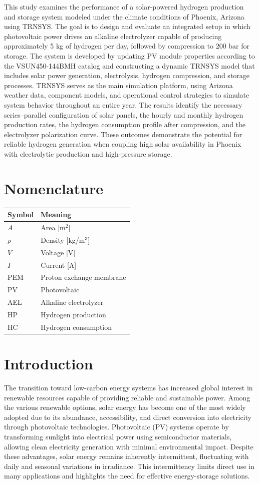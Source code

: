 \documentclass[11pt,a4paper]{article}
\begin{document}
This study examines the performance of a solar-powered hydrogen production and storage system modeled under the climate conditions of Phoenix, Arizona using TRNSYS. The goal is to design and evaluate an integrated setup in which photovoltaic power drives an alkaline electrolyzer capable of producing approximately 5 kg of hydrogen per day, followed by compression to 200 bar for storage. The system is developed by updating PV module properties according to the VSUN450-144BMH catalog and constructing a dynamic TRNSYS model that includes solar power generation, electrolysis, hydrogen compression, and storage processes. TRNSYS serves as the main simulation platform, using Arizona weather data, component models, and operational control strategies to simulate system behavior throughout an entire year. The results identify the necessary series--parallel configuration of solar panels, the hourly and monthly hydrogen production rates, the hydrogen consumption profile after compression, and the electrolyzer polarization curve. These outcomes demonstrate the potential for reliable hydrogen generation when coupling high solar availability in Phoenix with electrolytic production and high-pressure storage.

\section*{Nomenclature}
\begin{tabular}{ll}\toprule Symbol & Meaning\\\midrule
$A$ & Area [m$^2$]\\$\rho$ & Density [kg/m$^3$]\\$V$ & Voltage [V]\\$I$ & Current [A]\\PEM & Proton exchange membrane\\PV & Photovoltaic\\AEL & Alkaline electrolyzer\\HP & Hydrogen production\\HC & Hydrogen consumption\\\bottomrule\end{tabular}

\FloatBarrier
\section{Introduction}

The transition toward low-carbon energy systems has increased global interest in renewable resources capable of providing reliable and sustainable power. Among the various renewable options, solar energy has become one of the most widely adopted due to its abundance, accessibility, and direct conversion into electricity through photovoltaic technologies. Photovoltaic (PV) systems operate by transforming sunlight into electrical power using semiconductor materials, allowing clean electricity generation with minimal environmental impact. Despite these advantages, solar energy remains inherently intermittent, fluctuating with daily and seasonal variations in irradiance. This intermittency limits direct use in many applications and highlights the need for effective energy-storage solutions.
\end{document}
